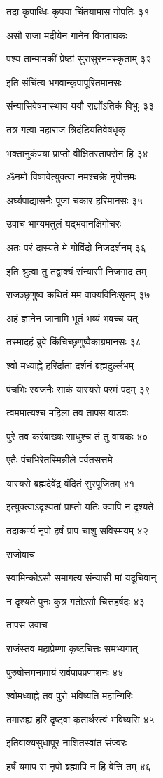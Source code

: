 तदा कृपाब्धिः कृपया चिंतयामास गोपतिः ३१

असौ राजा मदीयेन गानेन विगताघकः

पश्य तान्मामकीं प्रेष्ठां सुरासुरनमस्कृताम् ३२

इति संचिंत्य भगवान्कृपापूरितमानसः

संन्यासिवेषमास्थाय ययौ राज्ञोंऽतिकं विभुः ३३

तत्र गत्वा महाराज त्रिदंडियतिवेषधृक्

भक्तानुकंपया प्राप्तो वीक्षितस्तापसेन हि ३४

ॐनमो विष्णवेत्युक्त्वा नमश्चक्रे नृपोत्तमः

अर्घ्यपाद्यासनैः पूजां चकार हरिमानसः ३५

उवाच भाग्यमतुलं यद्भवानक्षिगोचरः

अतः परं दास्यते मे गोविंदो निजदर्शनम् ३६

इति श्रुत्वा तु तद्वाक्यं संन्यासी निजगाद तम्

राजञ्छृणुष्व कथितं मम वाक्यविनिःसृतम् ३७

अहं ज्ञानेन जानामि भूतं भव्यं भवच्च यत्

तस्मादहं ब्रुवे किंचिच्छृणुष्वैकाग्रमानसः ३८

श्वो मध्याह्ने हरिर्दाता दर्शनं ब्रह्मदुर्ल्लभम्

पंचभिः स्वजनैः साकं यास्यसे परमं पदम् ३९

त्वममात्यश्च महिला तव तापस वाडवः

पुरे तव करंबाख्यः साधुश्च तं तु वायकः ४०

एतैः पंचभिरेतस्मिन्नीले पर्वतसत्तमे

यास्यसे ब्रह्मदेवेंद्र वंदितं सुरपूजितम् ४१

इत्युक्त्वाऽदृश्यतां प्राप्तो यतिः क्वापि न दृश्यते

तदाकर्ण्य नृपो हर्षं प्राप चाशु सविस्मयम् ४२

राजोवाच

स्वामिन्कोऽसौ समागत्य संन्यासी मां यदूचिवान्

न दृश्यते पुनः कुत्र गतोऽसौ चित्तहर्षदः ४३

तापस उवाच

राजंस्तव महाप्रेम्णा कृष्टचित्तः समभ्यगात्

पुरुषोत्तमनामायं सर्वपापप्रणाशनः ४४

श्वोमध्याह्ने तव पुरो भविष्यति महान्गिरिः

तमारुह्य हरिं दृष्ट्वा कृतार्थस्त्वं भविष्यसि ४५

इतिवाक्यसुधापूर नाशितस्वांत संज्वरः

हर्षं यमाप स नृपो ब्रह्मापि न हि वेत्ति तम् ४६

